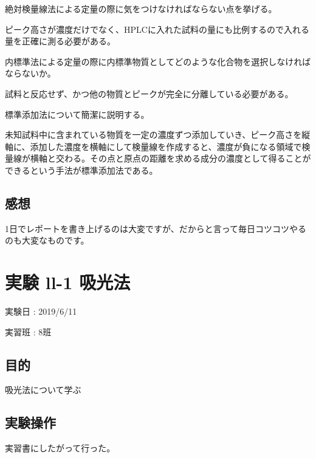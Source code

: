 \documentclass[a4paper,papersize,dvipdfmx]{jsarticle}
\begin{document}
\begin{tcolorbox}[colback=white,colbacktitle=black!10!white,coltitle=black,title={1}]
絶対検量線法による定量の際に気をつけなければならない点を挙げる。
\end{tcolorbox}

ピーク高さが濃度だけでなく、HPLCに入れた試料の量にも比例するので入れる量を正確に測る必要がある。

\begin{tcolorbox}[colback=white,colbacktitle=black!10!white,coltitle=black,title={2}]
内標準法による定量の際に内標準物質としてどのような化合物を選択しなければならないか。
\end{tcolorbox}

試料と反応せず、かつ他の物質とピークが完全に分離している必要がある。

\begin{tcolorbox}[colback=white,colbacktitle=black!10!white,coltitle=black,title={3}]
標準添加法について簡潔に説明する。
\end{tcolorbox}

未知試料中に含まれている物質を一定の濃度ずつ添加していき、ピーク高さを縦軸に、添加した濃度を横軸にして検量線を作成すると、濃度が負になる領域で検量線が横軸と交わる。その点と原点の距離を求める成分の濃度として得ることができるという手法が標準添加法である。


\subsection*{感想}
1日でレポートを書き上げるのは大変ですが、だからと言って毎日コツコツやるのも大変なものです。\newpage

\section*{実験 ll-1 吸光法}

\begin{flushright}
実験日 : 2019/6/11

実習班 : 8班
\end{flushright}

\subsection*{目的}
吸光法について学ぶ

\subsection*{実験操作}
実習書にしたがって行った。
\end{document}
